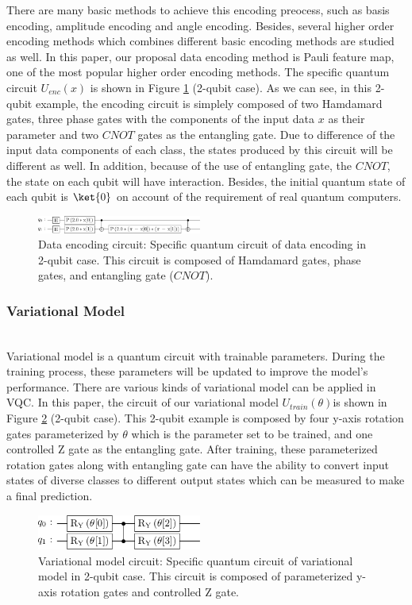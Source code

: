 \documentclass[sigconf]{acmart}
\begin{document}
There are many basic methods to achieve this encoding preocess, such as basis encoding, amplitude encoding and angle encoding. Besides, several higher order encoding methods which combines different basic encoding methods are studied as well. In this paper, our proposal data encoding method is Pauli feature map, one of the most popular higher order encoding methods. The specific quantum circuit $U_{enc}(x)$ is shown in Figure \ref{fig:encoding} (2-qubit case). As we can see, in this 2-qubit example, the encoding circuit is simplely composed of two Hamdamard gates, three phase gates with the components of the input data $x$ as their parameter and two $CNOT$ gates as the entangling gate. Due to difference of the input data components of each class, the states produced by this circuit will be different as well. In addition, because of the use of entangling gate, the $CNOT$, the state on each qubit will have interaction. Besides, the initial quantum state of each qubit is $\ket{0}$ on account of the requirement of real quantum computers.
\begin{figure}[!ht]
	\centering
	\includegraphics[width=0.48\textwidth]{encode.png}
	\caption{Data encoding circuit: {\small \textnormal{Specific quantum circuit of data encoding in 2-qubit case. This circuit is composed of Hamdamard gates, phase gates, and entangling gate ($CNOT$).}} }
	\label{fig:encoding}
\end{figure}
\subsubsection{Variational Model}\hfill\\
Variational model is a quantum circuit with trainable parameters. During the training process, these parameters will be updated to improve the model's performance. There are various kinds of variational model can be applied in VQC. In this paper, the circuit of our variational model $U_{train}(\theta)$is shown in Figure \ref{fig:variational} (2-qubit case). This 2-qubit example is composed by four y-axis rotation gates parameterized by $\theta$ which is the parameter set to be trained, and one controlled Z gate as the entangling gate. After training, these parameterized rotation gates along with entangling gate can have the ability to convert input states of diverse classes to different output states which can be measured to make a final prediction.   
\begin{figure}[!ht]
	\centering
	\includegraphics[width=0.48\textwidth]{vari.png}
	\caption{Variational model circuit: {\small \textnormal{Specific quantum circuit of variational model in 2-qubit case. This circuit is composed of parameterized y-axis rotation gates and controlled Z gate.}} }
	\label{fig:variational}
\end{figure}
\end{document}
